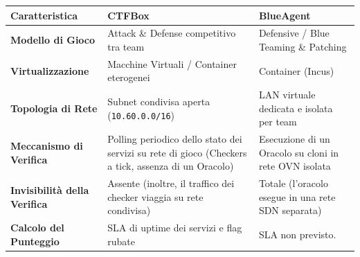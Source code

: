 \begin{longtable}[]{@{}
  >{\raggedright\arraybackslash}p{}
  >{\raggedright\arraybackslash}p{}
  >{\raggedright\arraybackslash}p{}@{}}
\toprule\noalign{}
\begin{minipage}[b]{\linewidth}\raggedright
Caratteristica
\end{minipage} & \begin{minipage}[b]{\linewidth}\raggedright
CTFBox
\end{minipage} & \begin{minipage}[b]{\linewidth}\raggedright
BlueAgent
\end{minipage} \\
\midrule\noalign{}
\endhead
\bottomrule\noalign{}
\endlastfoot
\textbf{Modello di Gioco} & Attack \& Defense competitivo tra team &
Defensive / Blue Teaming \& Patching \\
\textbf{Virtualizzazione} & Macchine Virtuali / Container eterogenei &
Container (Incus) \\
\textbf{Topologia di Rete} & Subnet condivisa aperta
(\passthrough{\lstinline!10.60.0.0/16!}) & LAN virtuale dedicata e
isolata per team \\
\textbf{Meccanismo di Verifica} & Polling periodico dello stato dei
servizi su rete di gioco (Checkers a tick, assenza di un Oracolo) &
Esecuzione di un Oracolo su cloni in rete OVN isolata \\
\textbf{Invisibilità della Verifica} & Assente (inoltre, il traffico dei
checker viaggia su rete condivisa) & Totale (l'oracolo esegue in una
rete SDN separata) \\
\textbf{Calcolo del Punteggio} & SLA di uptime dei servizi e flag rubate
& SLA non previsto. \\
\end{longtable}
